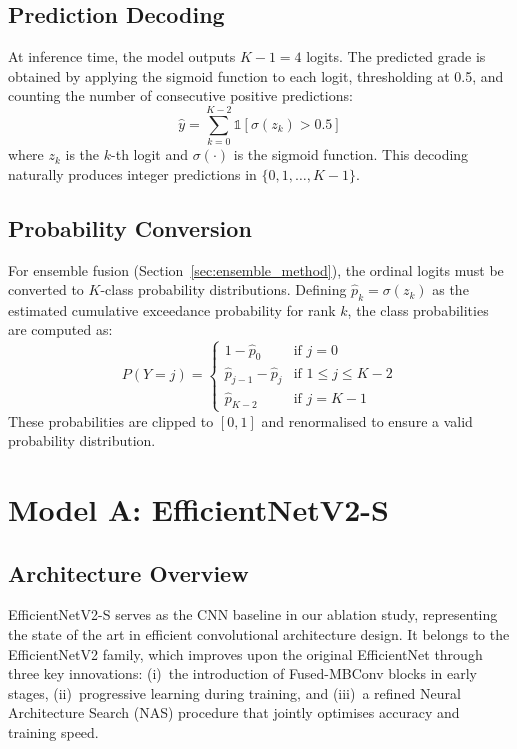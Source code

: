 \subsection{Prediction Decoding}

At inference time, the model outputs $K - 1 = 4$ logits. The predicted grade is obtained by applying the sigmoid function to each logit, thresholding at 0.5, and counting the number of consecutive positive predictions:
\begin{equation}
    \hat{y} = \sum_{k=0}^{K-2} \mathbb{1}\left[\sigma(z_k) > 0.5\right]
    \label{eq:corn_decode}
\end{equation}
where $z_k$ is the $k$-th logit and $\sigma(\cdot)$ is the sigmoid function. This decoding naturally produces integer predictions in $\{0, 1, \ldots, K-1\}$.

\subsection{Probability Conversion}

For ensemble fusion (Section~\ref{sec:ensemble_method}), the ordinal logits must be converted to $K$-class probability distributions. Defining $\hat{p}_k = \sigma(z_k)$ as the estimated cumulative exceedance probability for rank $k$, the class probabilities are computed as:
\begin{equation}
    P(Y = j) = \begin{cases}
        1 - \hat{p}_0 & \text{if } j = 0 \\
        \hat{p}_{j-1} - \hat{p}_j & \text{if } 1 \leq j \leq K-2 \\
        \hat{p}_{K-2} & \text{if } j = K-1
    \end{cases}
    \label{eq:corn_probs}
\end{equation}
These probabilities are clipped to $[0, 1]$ and renormalised to ensure a valid probability distribution.

\section{Model A: EfficientNetV2-S}
\label{sec:model_a}

\subsection{Architecture Overview}

EfficientNetV2-S \cite{tan2021efficientnetv2} serves as the CNN baseline in our ablation study, representing the state of the art in efficient convolutional architecture design. It belongs to the EfficientNetV2 family, which improves upon the original EfficientNet \cite{tan2019efficientnet} through three key innovations: (i)~the introduction of Fused-MBConv blocks in early stages, (ii)~progressive learning during training, and (iii)~a refined Neural Architecture Search (NAS) procedure that jointly optimises accuracy and training speed.

